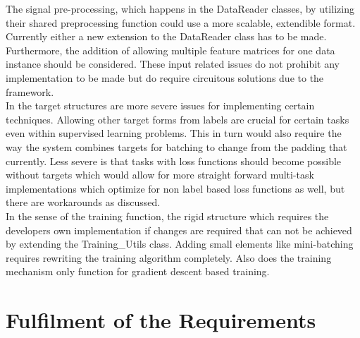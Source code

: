 The signal pre-processing, which happens in the DataReader classes, by utilizing their shared preprocessing function could use a more scalable, extendible format. Currently either a new extension to the DataReader class has to be made. Furthermore, the addition of allowing multiple feature matrices for one data instance should be considered. These input related issues do not prohibit any implementation to be made but do require circuitous solutions due to the framework.\\


In the target structures are more severe issues for implementing certain techniques. Allowing other target forms from labels are crucial for certain tasks even within supervised learning problems. This in turn would also require the way the system combines targets for batching to change from the padding that currently. Less severe is that tasks with loss functions should become possible without targets which would allow for more straight forward multi-task implementations which optimize for non label based loss functions as well, but there are workarounds as discussed.\\

In the sense of the training function, the rigid structure which requires the developers own implementation if changes are required that can not be achieved by extending the Training\_Utils class. Adding small elements like mini-batching requires rewriting the training algorithm completely. Also does the training mechanism only function for gradient descent based training. \\






% 







\section{Fulfilment of the Requirements}

